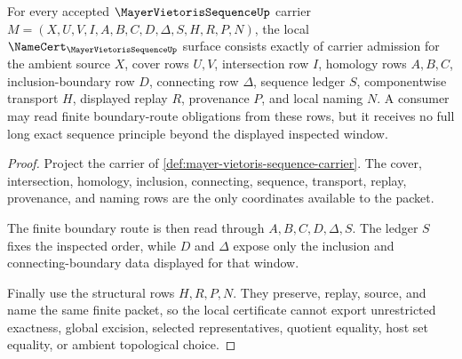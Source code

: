 \begin{theorem}
\label{thm:mayer-vietoris-sequence-namecert-obligations}
For every accepted $\MayerVietorisSequenceUp$ carrier $M=(X,U,V,I,A,B,C,D,\Delta,S,H,R,P,N)$, the local $\NameCert_{\MayerVietorisSequenceUp}$ surface consists exactly of carrier admission for the ambient source $X$, cover rows $U,V$, intersection row $I$, homology rows $A,B,C$, inclusion-boundary row $D$, connecting row $\Delta$, sequence ledger $S$, componentwise transport $H$, displayed replay $R$, provenance $P$, and local naming $N$. A consumer may read finite boundary-route obligations from these rows, but it receives no full long exact sequence principle beyond the displayed inspected window.
\end{theorem}
\begin{proof}
Project the carrier of \autoref{def:mayer-vietoris-sequence-carrier}. The cover, intersection, homology, inclusion, connecting, sequence, transport, replay, provenance, and naming rows are the only coordinates available to the packet.

The finite boundary route is then read through $A,B,C,D,\Delta,S$. The ledger $S$ fixes the inspected order, while $D$ and $\Delta$ expose only the inclusion and connecting-boundary data displayed for that window.

Finally use the structural rows $H,R,P,N$. They preserve, replay, source, and name the same finite packet, so the local certificate cannot export unrestricted exactness, global excision, selected representatives, quotient equality, host set equality, or ambient topological choice.
\end{proof}


